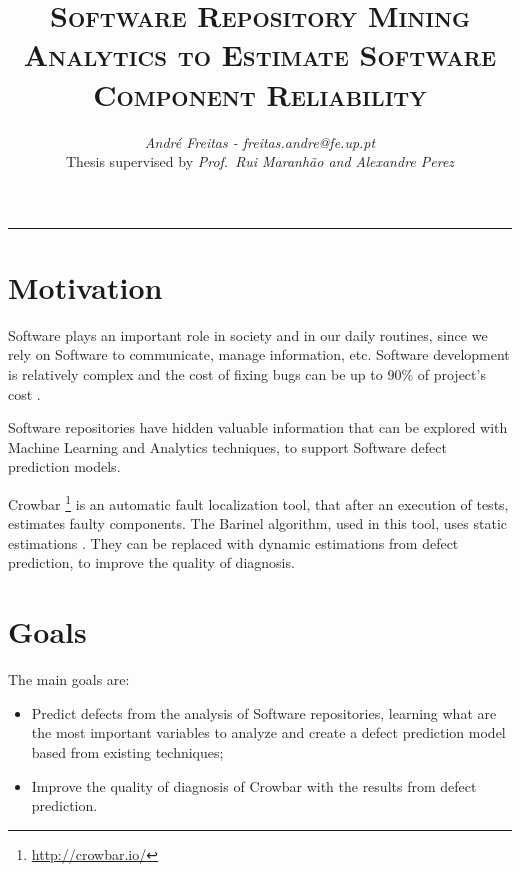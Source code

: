 \documentclass[9pt,a4paper]{extarticle}
\begin{document}
\title{\vspace*{-8mm}\textbf{\textsc{Software Repository Mining Analytics to Estimate Software Component Reliability}}}
\author{\emph{André Freitas - freitas.andre@fe.up.pt}\\[2mm]
\small{Thesis supervised by \emph{Prof.\ Rui Maranhão and Alexandre Perez}}}
\date{}
\maketitle
\thispagestyle{empty}

\vspace*{-4mm}\noindent\rule{\textwidth}{0.4pt}\vspace*{4mm}

\begin{multicols}{2}

\section{Motivation}\label{sec:motiva}
Software plays an important role in society and in our daily routines, since we
rely on Software to communicate, manage information, etc. Software development
is relatively complex and the cost of fixing bugs can be up to 90\% of project's
cost \cite{Servant1}.

Software repositories have hidden valuable information that can be explored with
Machine Learning and Analytics techniques, to support Software defect prediction
models.

Crowbar \footnote{\url{http://crowbar.io/}} is an automatic fault localization
tool, that after an execution of tests, estimates faulty components. The
Barinel algorithm, used in this tool, uses static estimations
\cite{Abreu:2009:SMF:1747491.1747511}. They can be replaced with dynamic estimations
from defect prediction, to improve the quality of diagnosis.

\section{Goals}\label{sec:goals}

The main goals are:

\begin{itemize}
\item Predict defects from the analysis of Software repositories, learning what
are the most important variables to analyze and create a defect prediction model
based from existing techniques;
\item Improve the quality of diagnosis of Crowbar with the results from defect
prediction.
\end{itemize}


\end{multicols}
\end{document}
